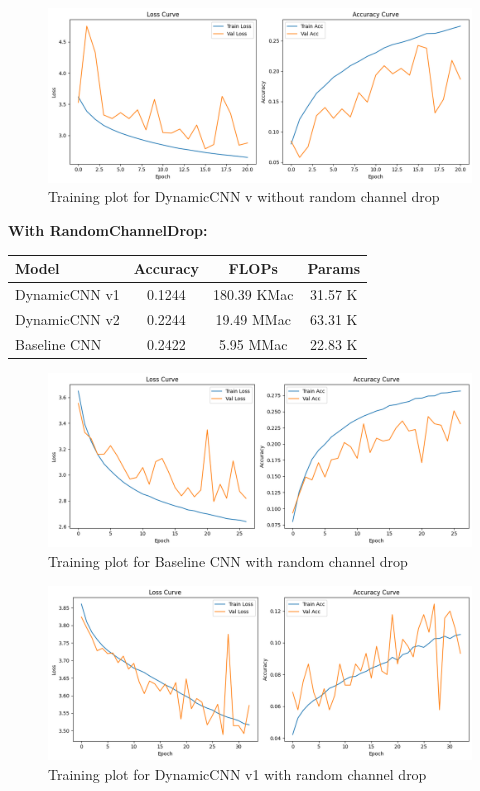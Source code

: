 \documentclass[12pt]{article}
\begin{document}
\begin{figure}[H]
\centering
\includegraphics[width=0.8\linewidth]{results/Dynamic2_no_drop.png}
\caption{Training plot for DynamicCNN v without random channel drop}
\end{figure}


\textbf{With RandomChannelDrop:}
\begin{center}
\begin{tabular}{lccc}
\toprule
Model & Accuracy & FLOPs & Params \\
\midrule
DynamicCNN v1 & 0.1244 & 180.39 KMac & 31.57 K \\
DynamicCNN v2 & 0.2244 & 19.49 MMac & 63.31 K \\
Baseline CNN & 0.2422 & 5.95 MMac & 22.83 K \\
\bottomrule
\end{tabular}
\end{center}


\begin{figure}[H]
\centering
\includegraphics[width=0.8\linewidth]{results/Baseline_CNN_drop.png}
\caption{Training plot for Baseline CNN  with random channel drop}
\end{figure}

\begin{figure}[H]
\centering
\includegraphics[width=0.8\linewidth]{results/Dynamic1_drop.png}
\caption{Training plot for DynamicCNN v1 with random channel drop}
\end{figure}
\end{document}
